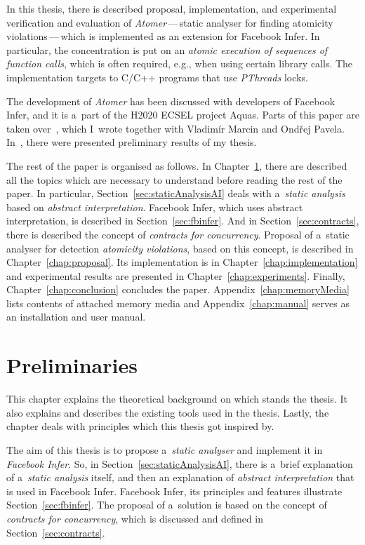 In this thesis, there is described proposal, implementation, and experimental
verification and evaluation of \emph{Atomer}\,---\,static analyser for
finding atomicity violations\,---\,which is implemented as an extension for
Facebook Infer. In particular, the concentration is put on an
\emph{atomic execution of sequences of function calls}, which is often
required, e.g., when using certain library calls. The implementation targets
to C/C++ programs that use \emph{PThreads} locks.

The development of \emph{Atomer} has been discussed with developers of
Facebook Infer, and it is a~part of the H2020 ECSEL project Aquas. Parts
of this paper are taken over~\cite{excel2019FBInfer}, which I~wrote
together with Vladimír Marcin and Ondřej Pavela. In~\cite{excel2019FBInfer},
there were presented preliminary results of my thesis.

The rest of the paper is organised as follows. In
Chapter~\ref{chap:preliminaries}, there are described all the topics
which are necessary to understand before reading the rest of the paper. In
particular, Section~\ref{sec:staticAnalysisAI} deals with
a~\emph{static analysis} based on \emph{abstract interpretation}.
Facebook Infer, which uses abstract interpretation, is described in
Section~\ref{sec:fbinfer}. And in Section~\ref{sec:contracts}, there is
described the concept of \emph{contracts for concurrency}. Proposal of a~static
analyser for detection \emph{atomicity violations}, based on this concept, is
described in Chapter~\ref{chap:proposal}. Its implementation is in
Chapter~\ref{chap:implementation} and experimental results are presented
in Chapter~\ref{chap:experiments}. Finally, Chapter~\ref{chap:conclusion}
concludes the paper. Appendix~\ref{chap:memoryMedia} lists contents
of attached memory media and Appendix~\ref{chap:manual} serves as an
installation and user manual.



\chapter{Preliminaries}
\label{chap:preliminaries}

This chapter explains the theoretical background on which stands the
thesis. It also explains and describes the existing tools used in the
thesis. Lastly, the chapter deals with principles which this thesis
got inspired by.

The aim of this thesis is to propose a~\emph{static analyser} and implement
it in \emph{Facebook Infer}. So, in Section~\ref{sec:staticAnalysisAI},
there is a~brief explanation of a~\emph{static analysis} itself, and then an
explanation of \emph{abstract interpretation} that is used in Facebook Infer.
Facebook Infer, its principles and features illustrate
Section~\ref{sec:fbinfer}. The proposal of a~solution is based on the
concept of \emph{contracts for concurrency}, which is discussed and defined
in Section~\ref{sec:contracts}.


